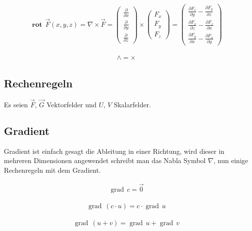 \documentclass[a4paper]{scrartcl}
\begin{document}
\begin{align}
\mathbf{\operatorname{rot}}\,\vec F(x,y,z) = \nabla\times \vec F =
\begin{pmatrix} \frac{\partial}{\partial x} \\ \frac{\partial}{\partial y} \\
\frac{\partial}{\partial z} \end{pmatrix} \times \begin{pmatrix} F_x\\ F_y\\ F_z
\end{pmatrix} = \begin{pmatrix} \frac{\partial F_z}{\partial y} - \frac{\partial
F_y}{\partial z} \\ \frac{\partial F_x}{\partial z} - \frac{\partial
F_z}{\partial x} \\ \frac{\partial F_y}{\partial x} - \frac{\partial
F_x}{\partial y} \end{pmatrix}
\end{align}

\begin{align}
\mathbf{\wedge = \times}
\end{align}


\subsection{Rechenregeln}
Es seien $\vec F$, $\vec G$ Vektorfelder und $U$, $V$ Skalarfelder.


\subsection{Gradient}

Gradient ist einfach gesagt die Ableitung in einer Richtung, wird dieser in mehreren Dimensionen angewendet schreibt man das Nabla Symbol $ \nabla $, nun einige Rechenregeln mit dem Gradient.

\begin{align}
\operatorname{grad}\,c=\vec{0}
\end{align}

\begin{align}
\operatorname{grad}\,(c\cdot u)=c\cdot\operatorname{grad}\,u
\end{align}

\begin{align}
\operatorname{grad}\,(u+v)=\operatorname{grad}\,u+\operatorname{grad}\,v
\end{align}
\end{document}
